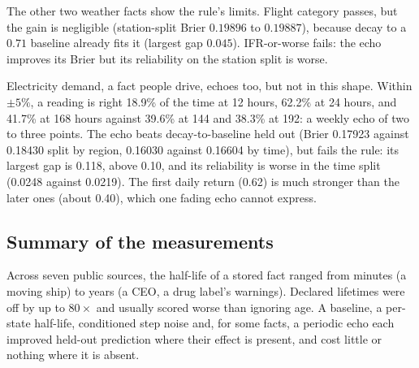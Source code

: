 The other two weather facts show the rule's limits. Flight category passes,
but the gain is negligible (station-split Brier $0.19896$ to $0.19887$),
because decay to a $0.71$ baseline already fits it (largest gap $0.045$).
IFR-or-worse fails: the echo improves its Brier but its reliability on the
station split is worse.

Electricity demand, a fact people drive, echoes too, but not in this
shape. Within $\pm 5\%$, a reading is right 18.9\% of the time at 12 hours,
62.2\% at 24 hours, and 41.7\% at 168 hours against 39.6\% at 144 and 38.3\%
at 192: a weekly echo of two to three points. The echo beats
decay-to-baseline held out (Brier 0.17923 against 0.18430 split by region,
0.16030 against 0.16604 by time), but fails the rule: its largest gap is
0.118, above 0.10, and its reliability is worse in the time split (0.0248
against 0.0219). The first daily return (0.62) is much stronger than the
later ones (about 0.40), which one fading echo cannot express.

\subsection{Summary of the measurements}

Across seven public sources, the half-life of a stored fact ranged from
minutes (a moving ship) to years (a CEO, a drug label's warnings).
Declared lifetimes were off by up to $80\times$ and usually scored worse
than ignoring age. A baseline, a per-state half-life, conditioned step
noise and, for some facts, a periodic echo each improved held-out
prediction where their effect is present, and cost little or nothing where
it is absent.
